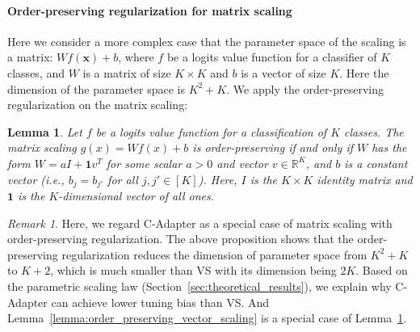 \documentclass{article}
\newcommand{\1}{\mathbbm{1}}
\theoremstyle{plain}
\newtheorem{lemma}[theorem]{Lemma}
\theoremstyle{definition}
\theoremstyle{remark}
\newtheorem{remark}[theorem]{Remark}
\begin{document}
\paragraph{Order-preserving regularization for matrix scaling} Here we consider a more complex case that the parameter space of the scaling is a matrix: \(W f(\boldsymbol{x}) + b\), where \(f\) be a logits value function for a classifier of \(K\) classes, and \(W\) is a matrix of size \(K \times K\) and \(b\) is a vector of size \(K\). Here the dimension of the parameter space is \(K^2 + K\). We apply the order-preserving regularization on the matrix scaling:

\begin{lemma}
    \label{lemma:order_preserving_matrix_scaling}
    Let $f$ be a logits value function for a classification of $K$ classes. The matrix scaling $g(x) = W f(x) + b$ is order-preserving if and only if $W$ has the form $W = a I + \mathbf{1} v^T$ for some scalar $a > 0$ and vector $v \in \mathbb{R}^K$, and $b$ is a constant vector (i.e., $b_j = b_{j'}$ for all $j, j'\in [K]$). Here, $I$ is the $K \times K$ identity matrix and $\mathbf{1}$ is the $K$-dimensional vector of all ones.
\end{lemma}

\begin{remark}
    Here, we regard C-Adapter as a special case of matrix scaling with order-preserving regularization. The above proposition shows that the order-preserving regularization reduces the dimension of parameter space from $K^2 +K$ to $K+2$, which is much smaller than VS  with its dimension being $2K$. Based on the parametric scaling law (Section~\ref{sec:theoretical_results}), we explain why C-Adapter can achieve lower tuning bias than VS\@. And Lemma~\ref{lemma:order_preserving_vector_scaling} is a special case of Lemma~\ref{lemma:order_preserving_matrix_scaling}.
\end{remark}
\end{document}
